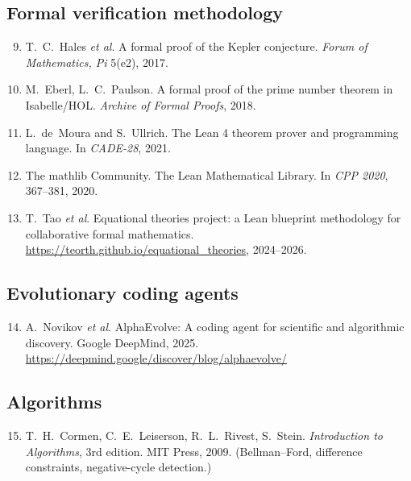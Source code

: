 \documentclass[11pt,a4paper]{article}
\theoremstyle{plain}
\theoremstyle{definition}
\begin{document}
\subsection*{Formal verification methodology}

\begin{enumerate}
\setcounter{enumi}{8}
\item T.~C.~Hales \emph{et al}. A formal proof of the Kepler conjecture.
       \emph{Forum of Mathematics, Pi} 5(e2), 2017.
\item M.~Eberl, L.~C.~Paulson. A formal proof of the prime number theorem
       in Isabelle/HOL. \emph{Archive of Formal Proofs}, 2018.
\item L.~de~Moura and S.~Ullrich. The Lean 4 theorem prover and
       programming language. In \emph{CADE-28}, 2021.
\item The mathlib Community. The Lean Mathematical Library. In
       \emph{CPP 2020}, 367--381, 2020.
\item T.~Tao \emph{et al}. Equational theories project: a Lean
       blueprint methodology for collaborative formal mathematics.
       \url{https://teorth.github.io/equational_theories}, 2024--2026.
\end{enumerate}

\subsection*{Evolutionary coding agents}

\begin{enumerate}
\setcounter{enumi}{13}
\item A.~Novikov \emph{et al}. AlphaEvolve: A coding agent for
       scientific and algorithmic discovery. Google DeepMind, 2025.
       \url{https://deepmind.google/discover/blog/alphaevolve/}
\end{enumerate}

\subsection*{Algorithms}

\begin{enumerate}
\setcounter{enumi}{14}
\item T.~H.~Cormen, C.~E.~Leiserson, R.~L.~Rivest, S.~Stein.
       \emph{Introduction to Algorithms}, 3rd edition. MIT Press, 2009.
       (Bellman--Ford, difference constraints, negative-cycle detection.)
\end{enumerate}
\end{document}
